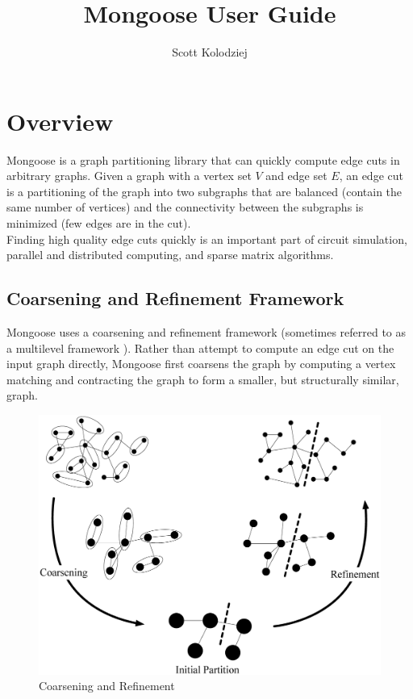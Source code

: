 \documentclass[letter]{article}
\title{Mongoose User Guide}
\author{Scott Kolodziej}
\begin{document}
\maketitle

\tableofcontents

\newpage

\section{Overview}
Mongoose is a graph partitioning library that can quickly compute edge cuts in arbitrary graphs. Given a graph with a vertex set $V$ and edge set $E$, an edge cut is a partitioning of the graph into two subgraphs that are balanced (contain the same number of vertices) and the connectivity between the subgraphs is minimized (few edges are in the cut).
\\

Finding high quality edge cuts quickly is an important part of circuit simulation, parallel and distributed computing, and sparse matrix algorithms.

\subsection{Coarsening and Refinement Framework}

Mongoose uses a coarsening and refinement framework (sometimes referred to as a multilevel framework \cite{HendricksonLeland1995, KarypisKumar1995}). Rather than attempt to compute an edge cut on the input graph directly, Mongoose first coarsens the graph by computing a vertex matching and contracting the graph to form a smaller, but structurally similar, graph.

\begin{figure}[!ht] 
\begin{center} 
    \includegraphics[scale=0.18]{Figures/MultilevelOverview.eps} 
    \caption{Coarsening and Refinement} 
\end{center} 
\end{figure} 
\end{document}
